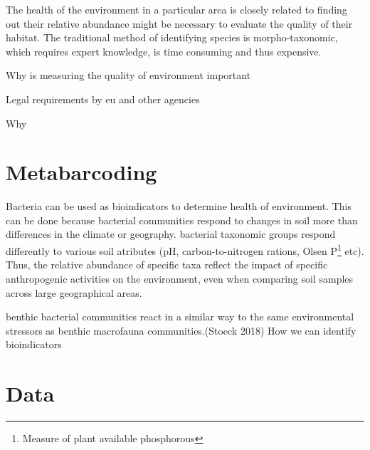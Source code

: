 The health of the environment in a particular area is closely related to finding out their relative abundance might be necessary to evaluate the quality of their habitat. The traditional method of identifying species is morpho-taxonomic, which requires expert knowledge, is time consuming and thus expensive. 

Why is measuring the quality of environment important

Legal requirements by eu and other agencies



Why

\section{Metabarcoding}
Bacteria can be used as bioindicators to determine health of environment. This can be done because bacterial communities respond to changes in soil more than differences in the climate or geography.  bacterial taxonomic groups respond differently to various soil atributes (pH, carbon-to-nitrogen rations, Olsen P\footnote{Measure of plant available phosphorous} etc). Thus, the relative abundance of specific taxa reflect the impact of specific anthropogenic activities on the environment, even when comparing soil samples across large geographical areas.\cite{hermans_bacteria_2016}

benthic bacterial communities react in a
similar way to the same environmental stressors as benthic macrofauna
communities.(Stoeck 2018)
How we can identify bioindicators 




\section{Data}
